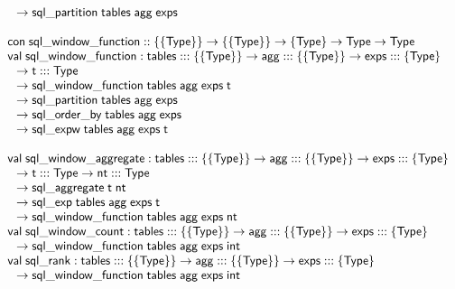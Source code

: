 \documentclass{article}
\newcommand{\mt}[1]{\mathsf{#1}}
\begin{document}
$$\begin{array}{l}
  \hspace{.1in} \to \mt{sql\_partition} \; \mt{tables} \; \mt{agg} \; \mt{exps} \\
  \\
  \mt{con} \; \mt{sql\_window\_function} :: \{\{\mt{Type}\}\} \to \{\{\mt{Type}\}\} \to \{\mt{Type}\} \to \mt{Type} \to \mt{Type} \\
  \mt{val} \; \mt{sql\_window\_function} : \mt{tables} ::: \{\{\mt{Type}\}\} \to \mt{agg} ::: \{\{\mt{Type}\}\} \to \mt{exps} ::: \{\mt{Type}\} \\
  \hspace{.1in} \to \mt{t} ::: \mt{Type} \\
  \hspace{.1in} \to \mt{sql\_window\_function} \; \mt{tables} \; \mt{agg} \; \mt{exps} \; \mt{t} \\
  \hspace{.1in} \to \mt{sql\_partition} \; \mt{tables} \; \mt{agg} \; \mt{exps} \\
  \hspace{.1in} \to \mt{sql\_order\_by} \; \mt{tables} \; \mt{agg} \; \mt{exps} \\
  \hspace{.1in} \to \mt{sql\_expw} \; \mt{tables} \; \mt{agg} \; \mt{exps} \; \mt{t} \\
  \\
  \mt{val} \; \mt{sql\_window\_aggregate} : \mt{tables} ::: \{\{\mt{Type}\}\} \to \mt{agg} ::: \{\{\mt{Type}\}\} \to \mt{exps} ::: \{\mt{Type}\} \\
  \hspace{.1in} \to \mt{t} ::: \mt{Type} \to \mt{nt} ::: \mt{Type} \\
  \hspace{.1in} \to \mt{sql\_aggregate} \; \mt{t} \; \mt{nt} \\
  \hspace{.1in} \to \mt{sql\_exp} \; \mt{tables} \; \mt{agg} \; \mt{exps} \; \mt{t} \\
  \hspace{.1in} \to \mt{sql\_window\_function} \; \mt{tables} \; \mt{agg} \; \mt{exps} \; \mt{nt} \\
  \mt{val} \; \mt{sql\_window\_count} : \mt{tables} ::: \{\{\mt{Type}\}\} \to \mt{agg} ::: \{\{\mt{Type}\}\} \to \mt{exps} ::: \{\mt{Type}\} \\
  \hspace{.1in} \to \mt{sql\_window\_function} \; \mt{tables} \; \mt{agg} \; \mt{exps} \; \mt{int} \\
  \mt{val} \; \mt{sql\_rank} : \mt{tables} ::: \{\{\mt{Type}\}\} \to \mt{agg} ::: \{\{\mt{Type}\}\} \to \mt{exps} ::: \{\mt{Type}\} \\
  \hspace{.1in} \to \mt{sql\_window\_function} \; \mt{tables} \; \mt{agg} \; \mt{exps} \; \mt{int}
\end{array}$$
\end{document}
